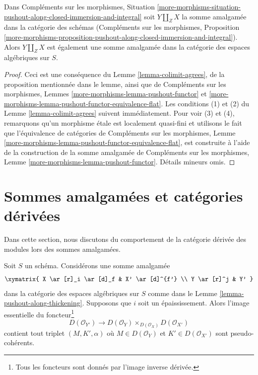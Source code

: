\begin{lemma}
\label{lemma-pushout-along-closed-immersion-and-integral}
Dans Compléments sur les morphismes, Situation
\ref{more-morphisms-situation-pushout-along-closed-immersion-and-integral}
soit $Y \amalg_Z X$ la somme amalgamée dans la catégorie des schémas
(Compléments sur les morphismes, Proposition
\ref{more-morphisms-proposition-pushout-along-closed-immersion-and-integral}).
Alors $Y \amalg_Z X$
est également une somme amalgamée dans la catégorie des espaces algébriques sur $S$.
\end{lemma}

\begin{proof}
Ceci est une conséquence du Lemme \ref{lemma-colimit-agrees}, de la proposition mentionnée dans le lemme, ainsi que de Compléments sur les morphismes, Lemmes \ref{more-morphisms-lemma-pushout-functor} et \ref{more-morphisms-lemma-pushout-functor-equivalence-flat}.
Les conditions (1) et (2) du Lemme \ref{lemma-colimit-agrees} suivent immédiatement. Pour voir (3) et (4), remarquons qu'un morphisme \'etale est localement quasi-fini et utilisons le fait que l'équivalence de catégories de Compléments sur les morphismes, Lemme \ref{more-morphisms-lemma-pushout-functor-equivalence-flat}, est construite à l'aide de la construction de la somme amalgamée de Compléments sur les morphismes, Lemme \ref{more-morphisms-lemma-pushout-functor}.
Détails mineurs omis.
\end{proof}








\section{Sommes amalgamées et catégories dérivées}
\label{section-pushouts-derived}

\noindent
Dans cette section, nous discutons du comportement de la catégorie dérivée des modules lors des sommes amalgamées.

\begin{lemma}
\label{lemma-pushout-along-thickening-derived}
Soit $S$ un schéma. Considérons une somme amalgamée
$$
\xymatrix{
X \ar[r]_i \ar[d]_f & X' \ar[d]^{f'}
\\
Y \ar[r]^j & Y'
}
$$
dans la catégorie des espaces algébriques sur $S$
comme dans le Lemme \ref{lemma-pushout-along-thickening}.
Supposons que $i$ soit un épaississement. Alors l'image essentielle du foncteur\footnote{Tous les foncteurs sont donnés par l'image inverse dérivée.}
$$
D(\mathcal{O}_{Y'}) \longrightarrow
D(\mathcal{O}_Y) \times_{D(\mathcal{O}_X)} D(\mathcal{O}_{X'})
$$
contient tout triplet $(M, K', \alpha)$ où $M \in D(\mathcal{O}_Y)$
et $K' \in D(\mathcal{O}_{X'})$ sont pseudo-cohérents.
\end{lemma}

